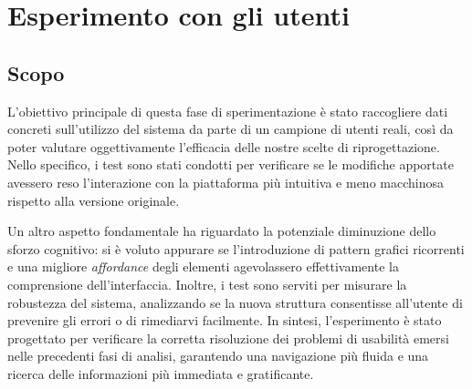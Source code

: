 \section{Esperimento con gli utenti}

\subsection{Scopo}
L'obiettivo principale di questa fase di sperimentazione è stato raccogliere dati concreti sull'utilizzo del sistema da parte di un campione di utenti reali, così da poter valutare oggettivamente l'efficacia delle nostre scelte di riprogettazione. Nello specifico, i test sono stati condotti per verificare se le modifiche apportate avessero reso l'interazione con la piattaforma più intuitiva e meno macchinosa rispetto alla versione originale. 

Un altro aspetto fondamentale ha riguardato la potenziale diminuzione dello sforzo cognitivo: si è voluto appurare se l'introduzione di pattern grafici ricorrenti e una migliore \textit{affordance} degli elementi agevolassero effettivamente la comprensione dell'interfaccia. Inoltre, i test sono serviti per misurare la robustezza del sistema, analizzando se la nuova struttura consentisse all'utente di prevenire gli errori o di rimediarvi facilmente. In sintesi, l'esperimento è stato progettato per verificare la corretta risoluzione dei problemi di usabilità emersi nelle precedenti fasi di analisi, garantendo una navigazione più fluida e una ricerca delle informazioni più immediata e gratificante.













